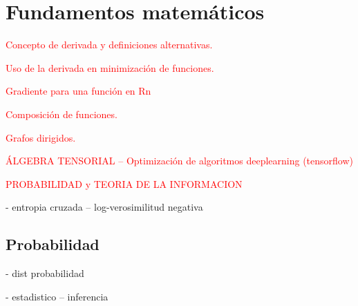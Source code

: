 \chapter{Fundamentos matemáticos}

\textcolor{red}{Concepto de derivada y definiciones alternativas.}

\textcolor{red}{Uso de la derivada en minimización de funciones.}

\textcolor{red}{Gradiente para una función en Rn}

\textcolor{red}{Composición de funciones.}

\textcolor{red}{Grafos dirigidos.}

\textcolor{red}{ÁLGEBRA TENSORIAL -- Optimización de algoritmos deeplearning (tensorflow)}

\textcolor{red}{PROBABILIDAD y TEORIA DE LA INFORMACION}
		
		- entropia cruzada -- log-verosimilitud negativa

\section{Probabilidad} \label{prob}

 - dist probabilidad
 
 - estadistico -- inferencia
 
